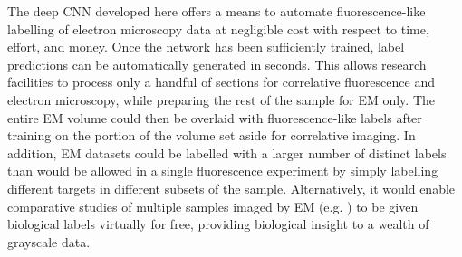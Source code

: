 The deep CNN developed here offers a means to automate fluorescence-like labelling of electron microscopy data at negligible cost with respect to time, effort, and money. Once the network has been sufficiently trained, label predictions can be automatically generated in seconds. This allows research facilities to process only a handful of sections for correlative fluorescence and electron microscopy, while preparing the rest of the sample for EM only. The entire EM volume could then be overlaid with fluorescence-like labels after training on the portion of the volume set aside for correlative imaging. In addition, EM datasets could be labelled with a larger number of distinct labels than would be allowed in a single fluorescence experiment by simply labelling different targets in different subsets of the sample.  Alternatively, it would enable comparative studies of multiple samples imaged by EM (e.g. \cite{sokol2015large, de2020large}) to be given biological labels virtually for free, providing biological insight to a wealth of grayscale data. 
